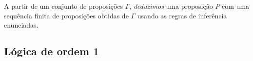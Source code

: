 \begin{comment}
\emph{Eliminações da Equivalência}:
\begin{prooftree}
\AxiomC{$P \lequiv P'$}
\RightLabel{$(\lequiv)$}
\UnaryInfC{$P \limplica P'$}
\end{prooftree}

\begin{prooftree}
\AxiomC{$P \lequiv P'$}
\RightLabel{$(\lequiv)$}
\UnaryInfC{$P' \limplica P$}
\end{prooftree}

\emph{Introdução da Condição}:
\begin{prooftree}
\AxiomC{ }
\AxiomC{$P$}
\LeftLabel{$\Big|$}
\UnaryInfC{$P'$}
\LeftLabel{$(\limplica)$}
\BinaryInfC{$P \limplica P'$}
\end{prooftree}

\emph{Eliminação da Condição}:
\begin{prooftree}
\AxiomC{$P$}
\AxiomC{$P \limplica P'$}
\RightLabel{$(\limplica)$}
\BinaryInfC{$P'$}
\end{prooftree}

\end{comment}

A partir de um conjunto de proposições $\Gamma$, \emph{deduzimos} uma proposição $P$ com uma sequência finita de proposições obtidas de $\Gamma$ usando as regras de inferência enunciadas.

\subsection{Lógica de ordem 1}

